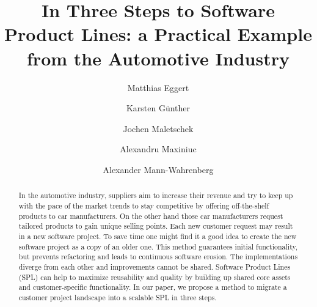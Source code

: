 \documentclass[sigconf]{acmart}
\begin{document}
\title{In Three Steps to Software Product Lines: a Practical Example from the Automotive Industry}

\author{Matthias Eggert}
\author{Karsten Günther}
\author{Jochen Maletschek}
\author{Alexandru Maxiniuc}
\author{Alexander Mann-Wahrenberg}

\newpage

\begin{abstract}
    In the automotive industry, suppliers aim to increase their revenue and try
    to keep up with the pace of the market trends to stay competitive by
    offering off-the-shelf products to car manufacturers. On the other hand
    those car manufacturers request tailored products to gain unique selling
    points. Each new customer request may result in a new software project. To
    save time one might find it a good idea to create the new software project
    as a copy of an older one. This method guarantees initial functionality, but
    prevents refactoring and leads to continuous software erosion. The
    implementations diverge from each other and improvements cannot be shared.
    Software Product Lines (SPL) can help to maximize reusability and quality by
    building up shared core assets and customer-specific functionality. In our
    paper, we propose a method to migrate a customer project landscape into a
    scalable SPL in three steps.
\end{abstract}
\end{document}
